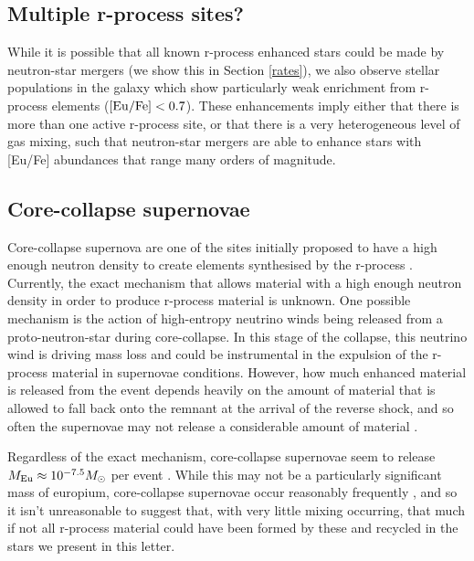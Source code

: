 \documentclass[a4paper,fleqn,usenatbib]{mnras}
\begin{document}
	
	
	\subsection{Multiple r-process sites?}
	While it is possible that all known r-process enhanced stars could be made by neutron-star mergers (we show this in Section \ref{rates}), we also observe stellar populations in the galaxy which show particularly weak enrichment from r-process elements ($[{\rm Eu/Fe}] < 0.7$). These enhancements imply either that there is more than one active r-process site, or that there is a very heterogeneous level of gas mixing, such that neutron-star mergers are able to enhance stars with [Eu/Fe] abundances that range many orders of magnitude.
	
	\subsection{Core-collapse supernovae}
	Core-collapse supernova are one of the sites initially proposed to have a high enough neutron density to create elements synthesised by the r-process \citep{Burbidge1957}. Currently, the exact  mechanism that allows material with a high enough neutron density in order to produce  r-process material is unknown.
	One possible mechanism is the action of high-entropy neutrino winds being released from a proto-neutron-star during core-collapse. In this stage of the collapse, this neutrino wind is driving mass loss and could be instrumental in the expulsion of the r-process material in supernovae conditions. However, how much enhanced material is released from the event depends heavily on the amount of material that is allowed to fall back onto the remnant at the arrival of the reverse shock, and so often the supernovae may not release a considerable amount of material \citep{Woosley1992, Burrows1995}. 
	
	Regardless of the exact mechanism, core-collapse supernovae seem to release $M_{\rm{Eu}}\approx10^{-7.5} M_{\odot}$ per event \citep{Argast2004}. While this may not be a particularly significant mass of europium, core-collapse supernovae occur reasonably frequently \citep[44,700$\,\ \rm{Gpc}^{-3} \rm{yr^{-1}}$;][]{Li2011}, and so it isn't unreasonable to suggest that, with very little mixing occurring, that much if not all r-process material could have been formed by these and recycled in the stars we present in this letter.
	
\end{document}
